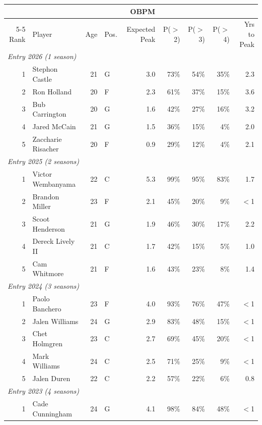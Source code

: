 \begin{table}[htbp]
  \centering\small
  \begin{tabular}{rlrlrrrrr}
    \toprule
     & & & & OBPM & & & & \\
    \cmidrule(lr){5-5}
    Rank & Player & Age & Pos. & Expected Peak & P($>$2) & P($>$3) & P($>$4) & Yrs to Peak \\
    \midrule
    \multicolumn{9}{l}{\textit{Entry 2026 (1 season)}} \\
    \midrule
    1 & Stephon Castle & 21 & G & 3.0 & 73\% & 54\% & 35\% & 2.3 \\
    2 & Ron Holland & 20 & F & 2.3 & 61\% & 37\% & 15\% & 3.6 \\
    3 & Bub Carrington & 20 & G & 1.6 & 42\% & 27\% & 16\% & 3.2 \\
    4 & Jared McCain & 21 & G & 1.5 & 36\% & 15\% & 4\% & 2.0 \\
    5 & Zaccharie Risacher & 20 & F & 0.9 & 29\% & 12\% & 4\% & 2.1 \\
    \midrule[0.4pt]
    \multicolumn{9}{l}{\textit{Entry 2025 (2 seasons)}} \\
    \midrule
    1 & Victor Wembanyama & 22 & C & 5.3 & 99\% & 95\% & 83\% & 1.7 \\
    2 & Brandon Miller & 23 & F & 2.1 & 45\% & 20\% & 9\% & $<$1 \\
    3 & Scoot Henderson & 21 & G & 1.9 & 46\% & 30\% & 17\% & 2.2 \\
    4 & Dereck Lively II & 21 & C & 1.7 & 42\% & 15\% & 5\% & 1.0 \\
    5 & Cam Whitmore & 21 & F & 1.6 & 43\% & 23\% & 8\% & 1.4 \\
    \midrule[0.4pt]
    \multicolumn{9}{l}{\textit{Entry 2024 (3 seasons)}} \\
    \midrule
    1 & Paolo Banchero & 23 & F & 4.0 & 93\% & 76\% & 47\% & $<$1 \\
    2 & Jalen Williams & 24 & G & 2.9 & 83\% & 48\% & 15\% & $<$1 \\
    3 & Chet Holmgren & 23 & C & 2.7 & 69\% & 45\% & 20\% & $<$1 \\
    4 & Mark Williams & 24 & C & 2.5 & 71\% & 25\% & 9\% & $<$1 \\
    5 & Jalen Duren & 22 & C & 2.2 & 57\% & 22\% & 6\% & 0.8 \\
    \midrule[0.4pt]
    \multicolumn{9}{l}{\textit{Entry 2023 (4 seasons)}} \\
    \midrule
    1 & Cade Cunningham & 24 & G & 4.1 & 98\% & 84\% & 48\% & $<$1 \\

\end{tabular}
\end{table}
